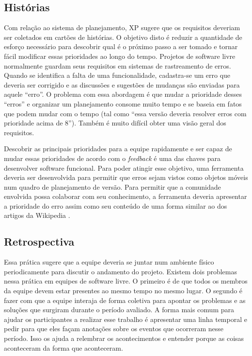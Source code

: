 \subsection{Histórias}
\label{subsec:stories}

Com relação ao sistema de planejamento, XP sugere que os requisitos
deveriam ser coletados em cartões de histórias. O objetivo disto é
reduzir a quantidade de esforço necessário para descobrir qual é o
próximo passo a ser tomado e tornar fácil modificar essas prioridades
ao longo do tempo. Projetos de software livre normalmente guardam seus
requisitos em sistemas de rastreamento de erros. Quando se identifica
a falta de uma funcionalidade, cadastra-se um erro que deveria ser
corrigido e as discussões e sugestões de mudanças são enviadas para
aquele ``erro''. O problema com essa abordagem é que mudar a
prioridade desses ``erros'' e organizar um planejamento consome muito
tempo e se baseia em fatos que podem mudar com o tempo (tal como
``essa versão deveria resolver erros com prioridade acima de
8''). Também é muito difícil obter uma visão geral dos requisitos.

Descobrir as principais prioridades para a equipe rapidamente e ser
capaz de mudar essas prioridades de acordo com o \emph{feedback} é uma
das chaves para desenvolver software funcional. Para poder atingir
esse objetivo, uma ferramenta deveria ser desenvolvida para permitir
que erros sejam vistos como objetos móveis num quadro de planejamento
de versão. Para permitir que a comunidade envolvida possa colaborar
com seu conhecimento, a ferramenta deveria apresentar a prioridade do
erro assim como seu conteúdo de uma forma similar ao dos artigos da
Wikipedia \cite{Surowiecki2004,Tapscott2006,Benkler2006}.

\subsection{Retrospectiva}
\label{subsec:retrospect}

Essa prática sugere que a equipe deveria se juntar num ambiente físico
periodicamente para discutir o andamento do projeto. Existem dois
problemas nessa prática em equipes de software livre. O primeiro é de
que todos os membros da equipe devem estar presentes ao mesmo tempo no
mesmo lugar. O segundo é fazer com que a equipe interaja de forma
coletiva para apontar os problemas e as soluções que surgiram durante
o período avaliado. A forma mais comum para ajudar os participantes a
realizar esse trabalho é apresentar uma linha temporal e pedir para
que eles façam anotações sobre os eventos que ocorreram nesse
período. Isso os ajuda a relembrar os acontecimentos e entender porque
as coisas aconteceram da forma que aconteceram.

